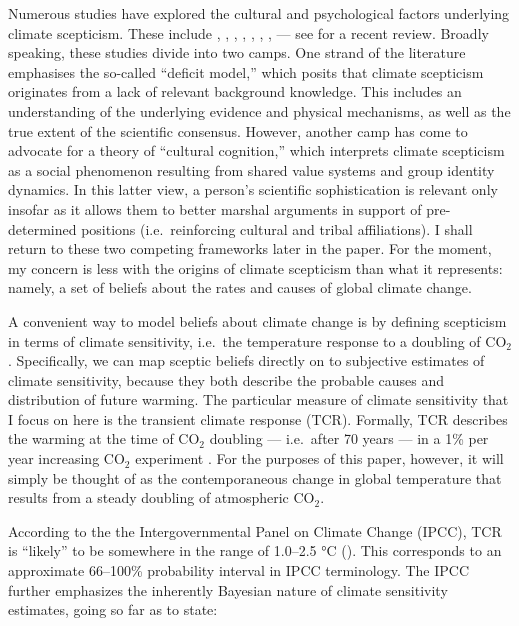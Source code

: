 \documentclass[smallextended]{svjour3}       %
\begin{document}
Numerous studies have explored the cultural and psychological factors
underlying climate scepticism. These include \cite{kahan2011cultural},
\cite{kahan2012polarizing}, \cite{mccright2011cool},
\cite{mccright2011politicization}, \cite{corner2012uncertainty},
\cite{ranney2012changing}, \cite{clark2013knowledge},
\cite{lewandowsky2019influence} --- see \cite{hornsey2016meta} for a
recent review. Broadly speaking, these studies divide into two camps.
One strand of the literature emphasises the so-called ``deficit model,''
which posits that climate scepticism originates from a lack of relevant
background knowledge. This includes an understanding of the underlying
evidence and physical mechanisms, as well as the true extent of the
scientific consensus. However, another camp has come to advocate for a
theory of ``cultural cognition,'' which interprets climate scepticism as
a social phenomenon resulting from shared value systems and group
identity dynamics. In this latter view, a person's scientific
sophistication is relevant only insofar as it allows them to better
marshal arguments in support of pre-determined positions
(i.e.~reinforcing cultural and tribal affiliations). I shall return to
these two competing frameworks later in the paper. For the moment, my
concern is less with the origins of climate scepticism than what it
represents: namely, a set of beliefs about the rates and causes of
global climate change.

A convenient way to model beliefs about climate change is by defining
scepticism in terms of climate sensitivity, i.e.~the temperature
response to a doubling of CO\(_2\). Specifically, we can map sceptic
beliefs directly on to subjective estimates of climate sensitivity,
because they both describe the probable causes and distribution of
future warming. The particular measure of climate sensitivity that I
focus on here is the transient climate response (TCR). Formally, TCR
describes the warming at the time of CO\(_2\) doubling --- i.e.~after 70
years --- in a 1\% per year increasing CO\(_2\) experiment
\cite{ipcc2013i}. For the purposes of this paper, however, it will
simply be thought of as the contemporaneous change in global temperature
that results from a steady doubling of atmospheric CO\(_2\).

According to the the Intergovernmental Panel on Climate Change (IPCC),
TCR is ``likely'' to be somewhere in the range of 1.0--2.5 °C
(\cite{ipcc2013i}). This corresponds to an approximate 66--100\%
probability interval in IPCC terminology. The IPCC further emphasizes
the inherently Bayesian nature of climate sensitivity estimates, going
so far as to state:
\end{document}
